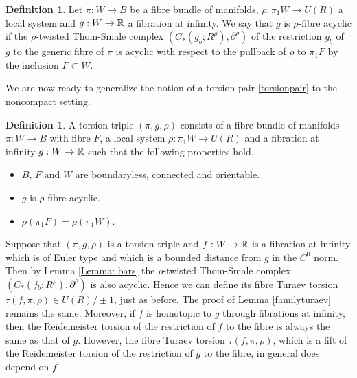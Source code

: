 \documentclass[11pt]{article}
\numberwithin{equation}{section}\providecommand{\dpl}{\displaystyle}
\theoremstyle{plain}
\theoremstyle{definition}
\newtheorem{definition}[theorem]{Definition}
\begin{document}
\begin{definition}
Let $\pi: W \to B$ be a fibre bundle of manifolds, $\rho: \pi_1W \to U(R)$ a local system and $g:W \to \mathbb{R}$ a fibration at infinity. We say that $g$ is $\rho$-fibre acyclic if the $\rho$-twisted Thom-Smale complex $(C_*(g_b; R^\rho), \partial^\rho)$ of the restriction $g_b$ of $g$ to the generic fibre of $\pi$ is acyclic with respect to the pullback of $\rho$ to $\pi_1F$ by the inclusion $F \subset W$.
\end{definition}

We are now ready to generalize the notion of a torsion pair \ref{torsionpair} to the noncompact setting.

\begin{definition}\label{torsiontriple}
A torsion triple $(\pi, g, \rho)$ consists of a fibre bundle of manifolds $\pi: W \to B$ with fibre $F$, a local system $\rho: \pi_1W \to U(R)$ and a fibration at infinity $g:W \to \mathbb{R}$ such that the following properties hold.
\begin{itemize}
\item $B$, $F$ and $W$ are boundaryless, connected and orientable.
\item $g$ is $\rho$-fibre acyclic.
\item $\rho(\pi_1F)=\rho(\pi_1W)$.
\end{itemize}
\end{definition}
Suppose that $(\pi, g, \rho)$ is a torsion triple and $f:W \to \mathbb{R}$ is a fibration at infinity which is of Euler type and which is a bounded distance from $g$ in the $C^0$ norm. Then by Lemma \ref{Lemma: bars} the $\rho$-twisted Thom-Smale complex $(C_*(f_b; R^\rho), \partial^\rho)$ is also acyclic. Hence we can define its fibre Turaev torsion $\tau( f,\pi,\rho) \in U(R) / \pm1 $, just as before. The proof of Lemma \ref{familyturaev} remains the same. Moreover, if $f$ is homotopic to $g$ through fibrations at infinity, then the Reidemeister torsion of the restriction of $f$ to the fibre is always the same as that of $g$. However, the fibre Turaev torsion $\tau(f,\pi, \rho)$, which is a lift of the Reidemeister torsion of the restriction of $g$ to the fibre, in general does depend on $f$.
\end{document}
